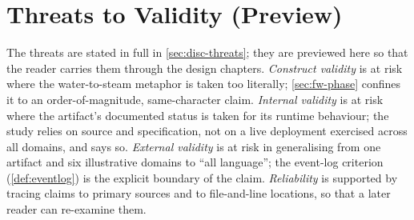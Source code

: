 \section{Threats to Validity (Preview)}
\label{sec:m-threats}

The threats are stated in full in \cref{sec:disc-threats}; they are previewed
here so that the reader carries them through the design chapters. \emph{Construct
validity} is at risk where the water-to-steam metaphor is taken too literally;
\cref{sec:fw-phase} confines it to an order-of-magnitude, same-character claim.
\emph{Internal validity} is at risk where the artifact's documented status is
taken for its runtime behaviour; the study relies on source and specification,
not on a live deployment exercised across all domains, and says so.
\emph{External validity} is at risk in generalising from one artifact and six
illustrative domains to ``all language''; the event-log criterion
(\cref{def:eventlog}) is the explicit boundary of the claim. \emph{Reliability}
is supported by tracing claims to primary sources and to file-and-line locations,
so that a later reader can re-examine them.
